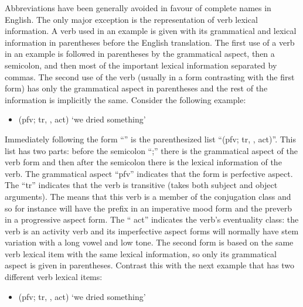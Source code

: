 Abbreviations have been generally avoided in favour of complete names in English.
The only major exception is the representation of verb lexical information.
A verb used in an example is given with its grammatical and lexical information in parentheses before the English translation.
The first use of a verb in an example is followed in parentheses by the grammatical aspect, then a semicolon, and then most of the important lexical information separated by commas. The second use of the verb (usually in a form contrasting with the first form) has only the grammatical aspect in parentheses and the rest of the information is implicitly the same.
Consider the following example:

\begin{itemize}
\item	{} (pfv; tr, ,  act) ‘we dried something’
\end{itemize}

Immediately following the form “” is the parenthesized list “(pfv; tr, ,  act)”.
This list has two parts: before the semicolon “;” there is the grammatical aspect of the verb form and then after the semicolon there is the lexical information of the verb.
The grammatical aspect “pfv” indicates that the form is perfective aspect.
The “tr” indicates that the verb is transitive (takes both subject and object arguments).
The  means that this verb is a member of the  conjugation class and so for instance will have the prefix  in an imperative mood form and the preverb  in a progressive aspect form.
The “ act” indicates the verb’s eventuality class: the verb is an activity verb and its imperfective aspect forms will normally have  stem variation with a long vowel and low tone.
The second form  is based on the same verb lexical item with the same lexical information, so only its grammatical aspect is given in parentheses.
Contrast this with the next example that has two different verb lexical items:

\begin{itemize}
\item	{} (pfv; tr, ,  act) ‘we dried something’
\end{itemize}


